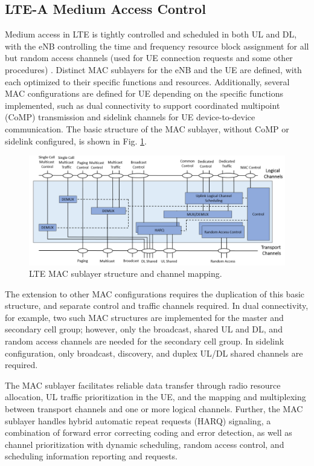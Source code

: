 \subsection{\mbox{LTE-A} Medium Access Control}
\label{lte-mac}
Medium access in LTE is tightly controlled and scheduled in both UL and DL, with the eNB controlling the time and frequency resource block assignment for all but random access channels (used for UE connection requests and some other procedures) \cite{tr36321}.  Distinct MAC sublayers for the eNB and the UE are defined, with each optimized to their specific functions and resources.  Additionally, several MAC configurations are defined for UE depending on the specific functions implemented, such as dual connectivity to support coordinated multipoint (CoMP) transmission and sidelink channels for UE device-to-device communication. The basic structure of the MAC sublayer, without CoMP or sidelink configured, is shown in Fig. \ref{figs:lte-mac}.
\begin{figure}[!ht]
	\centering
	\includegraphics[width=\textwidth]{figs/LTE-MAC}	
	\caption{LTE MAC sublayer structure and channel mapping.}
	\label{figs:lte-mac}
\end{figure}
The extension to other MAC configurations requires the duplication of this basic structure, and separate control and traffic channels required. In dual connectivity, for example, two such MAC structures are implemented for the master and secondary cell group; however, only the broadcast, shared UL and DL, and random access channels are needed for the secondary cell group.  In sidelink configuration, only broadcast, discovery, and duplex UL/DL shared channels are required.

The MAC sublayer facilitates reliable data transfer through radio resource allocation, UL traffic prioritization in the UE, and the mapping and multiplexing between transport channels and one or more logical channels. Further, the MAC sublayer handles hybrid automatic repeat requests (HARQ) signaling, a combination of forward error correcting coding and error detection, as well as channel prioritization with dynamic scheduling, random access control, and scheduling information reporting and requests.

